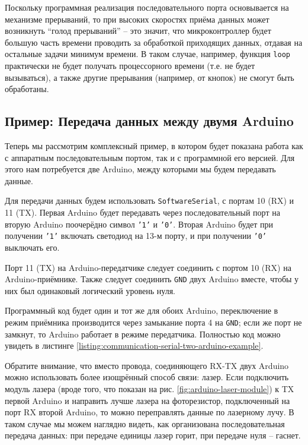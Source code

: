 \documentclass[../sparc.tex]{subfiles}
\begin{document}
Поскольку программная реализация последовательного порта основывается на
механизме прерываний, то при высоких скоростях приёма данных может возникнуть
``голод прерываний'' -- это значит, что микроконтроллер будет большую часть
времени проводить за обработкой приходящих данных, отдавая на остальные задачи
минимум времени.  В таком случае, например, функция \texttt{loop} практически не
будет получать процессорного времени (т.е. не будет вызываться), а также другие
прерывания (например, от кнопок) не смогут быть обработаны.

\subsection{Пример: Передача данных между двумя Arduino}

Теперь мы рассмотрим комплексный пример, в котором будет показана работа как с
аппаратным последовательным портом, так и с программной его версией.  Для этого
нам потребуется две Arduino, между которыми мы будем передавать данные.

Для передачи данных будем использовать \texttt{SoftwareSerial}, с портам 10 (RX)
и 11 (TX).  Первая Arduino будет передавать через последовательный порт на
вторую Arduino поочерёдно символ \texttt{'1'} и \texttt{'0'}.  Вторая Arduino
будет при получении \texttt{'1'} включать светодиод на 13-м порту, и при
получении \texttt{'0'} выключать его.

Порт 11 (TX) на Arduino-передатчике следует соединить с портом 10 (RX) на
Arduino-приёмнике.  Также следует соединить \texttt{GND} двух Arduino вместе,
чтобы у них был одинаковый логический уровень нуля.

Программный код будет один и тот же для обоих Arduino, переключение в режим
приёмника производится через замыкание порта 4 на \texttt{GND}; если же порт не
замкнут, то Arduino работает в режиме передатчика.  Полностью код можно увидеть
в листинге \ref{listing:communication-serial-two-arduino-example}.

Обратите внимание, что вместо провода, соединяющего RX-TX двух Arduino можно
использовать более изощрённый способ связи: лазер.  Если подключить модуль
лазера (вроде того, что показан на рис. \ref{fig:arduino-laser-module}) к TX
первой Arduino и направить лучше лазера на фоторезистор, подключенный на порт RX
второй Arduino, то можно переправлять данные по лазерному лучу.  В таком случае
мы можем наглядно видеть, как организована последовательная передача данных: при
передаче единицы лазер горит, при передаче нуля -- гаснет.
\end{document}

